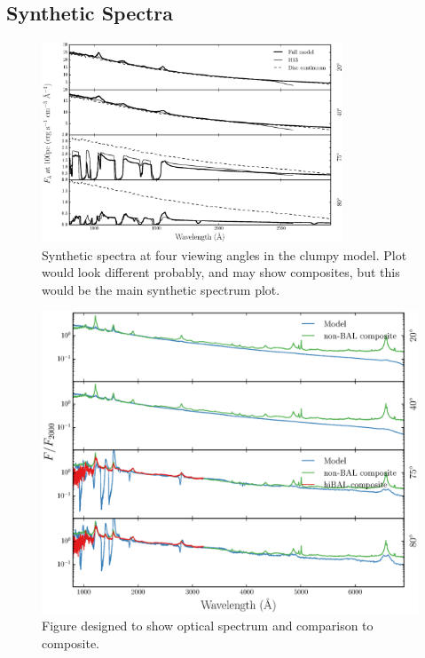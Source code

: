\documentclass[preprint, a4paper, 11pt]{aastex}
\begin{document}
\subsection{Synthetic Spectra}

\begin{figure} %
\centering
\includegraphics[width=0.8\textwidth]{figures/uvspec.eps}
\caption
{
Synthetic spectra at four viewing angles in the clumpy model. Plot would look different probably,
and may show composites, but this would be the main synthetic spectrum plot.
}
\label{fig:uvspec}
\end{figure} %

\begin{figure} %
\centering
\includegraphics[width=1.0\textwidth]{figures/opt.eps}
\caption
{
Figure designed to show optical spectrum and comparison to composite.
}
\label{fig:uvspec}
\end{figure} %
\end{document}
